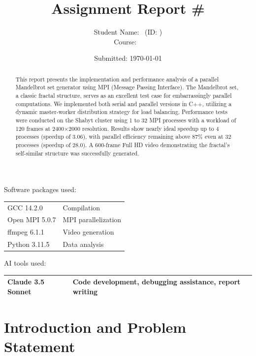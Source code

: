 \documentclass[11pt,a4paper]{article}
\title{Assignment Report \#\assignmentnumber \\ \assignmenttitle}
\author{Student Name: \studentname \ (ID: \studentid) \\ Course: \coursecode \ \coursename}
\date{Submitted: \today}
\begin{document}
	\maketitle
	
	\begin{center}
		{Software packages used:} \\
		\begin{tabular}{|l|l|}
			\hline
			GCC 14.2.0               &  Compilation \\
			Open MPI 5.0.7           &  MPI parallelization \\
			ffmpeg 6.1.1             &  Video generation \\
			Python 3.11.5            &  Data analysis \\
			\hline
		\end{tabular}
	\end{center}
	
	\begin{center}
		{AI tools used:} \\
		\begin{tabular}{|l|l|}
			\hline
			Claude 3.5 Sonnet  & Code development, debugging assistance, report writing \\
			\hline
		\end{tabular}
	\end{center}
	\vspace{2em}
	
	\begin{abstract}
		\noindent
		This report presents the implementation and performance analysis of a parallel Mandelbrot set generator using MPI (Message Passing Interface). The Mandelbrot set, a classic fractal structure, serves as an excellent test case for embarrassingly parallel computations. We implemented both serial and parallel versions in C++, utilizing a dynamic master-worker distribution strategy for load balancing. Performance tests were conducted on the Shabyt cluster using 1 to 32 MPI processes with a workload of 120 frames at 2400×2000 resolution. Results show nearly ideal speedup up to 4 processes (speedup of 3.06), with parallel efficiency remaining above 87\% even at 32 processes (speedup of 28.0). A 600-frame Full HD video demonstrating the fractal's self-similar structure was successfully generated.
	\end{abstract}
	
	\section{Introduction and Problem Statement}
	
\end{document}
